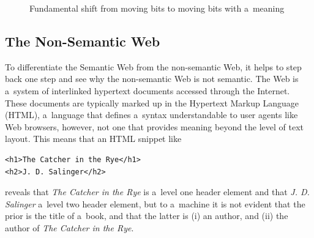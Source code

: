 \begin{figure}[!ht]
\centering
  \caption{Fundamental shift from moving bits to moving bits with a~meaning}
  \label{fig:fundamental-shift}  
\end{figure}

\subsection{The Non-Semantic Web} \label{sec:non-semantic-web}

To differentiate the Semantic Web from the non-semantic Web,
it helps to step back one step and
see why the non-semantic Web is not semantic.
The Web is a~system of interlinked hypertext documents
accessed through the Internet.
These documents are typically marked up in
the Hypertext Markup Language (HTML),
a~language that defines a~syntax
understandable to user agents like Web browsers,
however, not one that provides meaning
beyond the level of text layout.
This means that an HTML snippet like
\begin{verbatim}
<h1>The Catcher in the Rye</h1>
<h2>J. D. Salinger</h2>
\end{verbatim}
reveals that \emph{The Catcher in the Rye}
is a~level one header element and
that \emph{J. D. Salinger} a~level two header element,
but to a~machine it is not evident that the prior
is the title of a~book,
and that the latter is (i) an author, and (ii)
the author of \emph{The Catcher in the Rye}.

